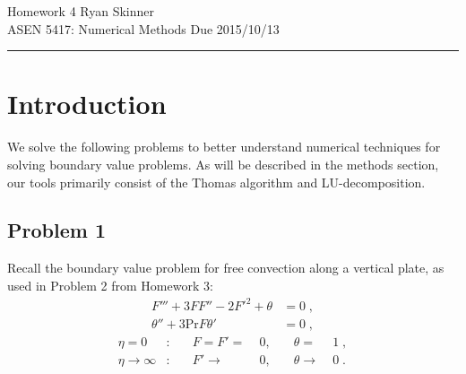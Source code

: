 \documentclass[12pt]{article}
\begin{document}
\pagestyle{fancyplain}
\lhead{}
\chead{}
\rhead{}
\cfoot{\hrule \thepage}

\noindent
{\Large Homework 4}
\hfill
{\large Ryan Skinner}
\\[0.5ex]
{\large ASEN 5417: Numerical Methods}
\hfill
{\large Due 2015/10/13}\\
\hrule
\vspace{6pt}

\section{Introduction} %

We solve the following problems to better understand numerical techniques for solving boundary value problems. As will be described in the methods section, our tools primarily consist of the Thomas algorithm and LU-decomposition.

\subsection{Problem 1}

Recall the boundary value problem for free convection along a vertical plate, as used in Problem 2 from Homework 3:
\begin{equation}
\begin{aligned}
F''' + 3 F F'' - 2F'^2 + \theta &= 0 \;, \\
\theta'' + 3 \text{Pr} F \theta' &= 0 \;,
\end{aligned}
\end{equation}
\begin{equation}
\begin{aligned}
\eta = 0 &: &\quad F = F' =\; &0, &\quad \theta =\; &1 \;, \\
\eta \rightarrow \infty &: &\quad F' \rightarrow\; &0, &\quad \theta \rightarrow\; &0
\;.
\end{aligned}
\end{equation}
\end{document}
